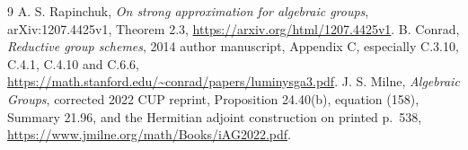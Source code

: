 \documentclass[11pt]{article}
\begin{document}
\begin{thebibliography}{9}
A. S. Rapinchuk, \emph{On strong approximation for algebraic groups},
arXiv:1207.4425v1, Theorem 2.3,
\url{https://arxiv.org/html/1207.4425v1}.
B. Conrad, \emph{Reductive group schemes}, 2014 author manuscript,
Appendix C, especially C.3.10, C.4.1, C.4.10 and C.6.6,
\url{https://math.stanford.edu/~conrad/papers/luminysga3.pdf}.
J. S. Milne, \emph{Algebraic Groups}, corrected 2022 CUP reprint,
Proposition 24.40(b), equation (158), Summary 21.96, and the
Hermitian adjoint construction on printed p.~538,
\url{https://www.jmilne.org/math/Books/iAG2022.pdf}.
\end{thebibliography}
\end{document}
